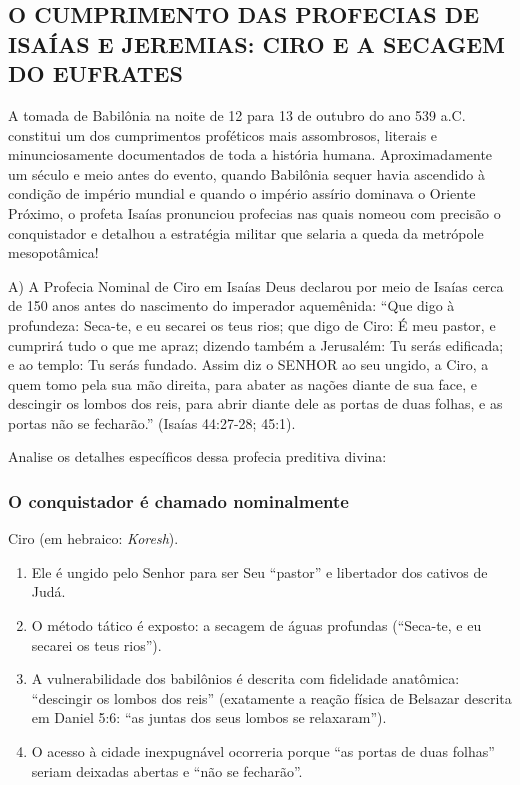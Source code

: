 \documentclass[11pt,a4paper,openany]{book}
\begin{document}
\subsection{O CUMPRIMENTO DAS PROFECIAS DE ISAÍAS E JEREMIAS: CIRO E A SECAGEM DO EUFRATES}


A tomada de Babilônia na noite de 12 para 13 de outubro do ano 539 a.C. constitui um dos cumprimentos proféticos mais assombrosos, literais e minunciosamente documentados de toda a história humana. Aproximadamente um século e meio antes do evento, quando Babilônia sequer havia ascendido à condição de império mundial e quando o império assírio dominava o Oriente Próximo, o profeta Isaías pronunciou profecias nas quais nomeou com precisão o conquistador e detalhou a estratégia militar que selaria a queda da metrópole mesopotâmica!

A) A Profecia Nominal de Ciro em Isaías
Deus declarou por meio de Isaías cerca de 150 anos antes do nascimento do imperador aquemênida:
``Que digo à profundeza: Seca-te, e eu secarei os teus rios; que digo de Ciro: É meu pastor, e cumprirá tudo o que me apraz; dizendo também a Jerusalém: Tu serás edificada; e ao templo: Tu serás fundado. Assim diz o SENHOR ao seu ungido, a Ciro, a quem tomo pela sua mão direita, para abater as nações diante de sua face, e descingir os lombos dos reis, para abrir diante dele as portas de duas folhas, e as portas não se fecharão.'' (Isaías 44:27-28; 45:1).

Analise os detalhes específicos dessa profecia preditiva divina:

\subsubsection*{O conquistador é chamado nominalmente}
Ciro (em hebraico: \textit{Koresh}).
\begin{enumerate}
  \item Ele é ungido pelo Senhor para ser Seu ``pastor'' e libertador dos cativos de Judá.
  \item O método tático é exposto: a secagem de águas profundas (``Seca-te, e eu secarei os teus rios'').
  \item A vulnerabilidade dos babilônios é descrita com fidelidade anatômica: ``descingir os lombos dos reis'' (exatamente a reação física de Belsazar descrita em Daniel 5:6: ``as juntas dos seus lombos se relaxaram'').
  \item O acesso à cidade inexpugnável ocorreria porque ``as portas de duas folhas'' seriam deixadas abertas e ``não se fecharão''.
\end{enumerate}
\end{document}
